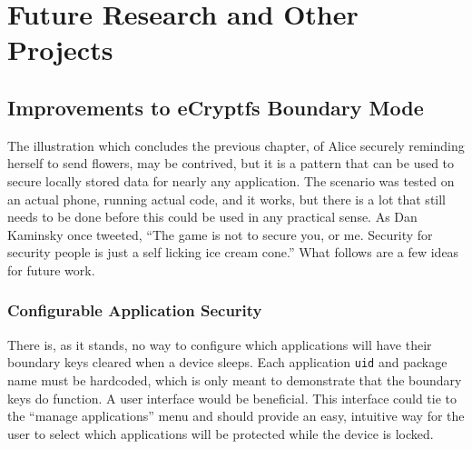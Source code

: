 \chapter{Future Research and Other Projects}
\label{ch:future}

\section{Improvements to eCryptfs Boundary Mode}
\label{sec:future}

The illustration which concludes the previous chapter, of Alice securely reminding herself to send flowers, may be contrived, but it
is a pattern that can be used to secure locally stored data for nearly any application. The scenario was tested on an actual phone,
running actual code, and it works, but there is a lot that still needs to be done before this could be used in any practical sense.
As Dan Kaminsky once tweeted, ``The game is not to secure you, or me. Security for security people is just a self licking ice cream
cone.'' What follows are a few ideas for future work.

\subsection{Configurable Application Security}
There is, as it stands, no way to configure which applications will have their boundary keys cleared when a device sleeps. 
Each application \texttt{uid} and package name must be hardcoded, which is only meant to demonstrate that the 
boundary keys do function. A user interface would be beneficial. This interface could tie to the ``manage applications'' menu and
should provide an easy, intuitive way for the user to select which applications will be protected while the device is locked.

